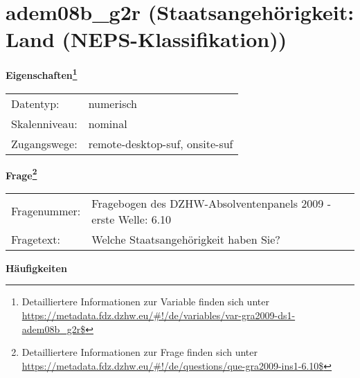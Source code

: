
    \setcounter{footnote}{0}

    \vspace*{-1.8cm}
	\section{adem08b\_g2r (Staatsangehörigkeit: Land (NEPS-Klassifikation))}
	\label{section:adem08b_g2r}



    \vspace*{0.5cm}
    \noindent\textbf{Eigenschaften\footnote{Detailliertere Informationen zur Variable finden sich unter
		\url{https://metadata.fdz.dzhw.eu/\#!/de/variables/var-gra2009-ds1-adem08b_g2r$}}}\\
	\begin{tabularx}{\hsize}{@{}lX}
	Datentyp: & numerisch \\
	Skalenniveau: & nominal \\
	Zugangswege: &
	  remote-desktop-suf, 
	  onsite-suf
 \\
    \end{tabularx}



				\vspace*{0.5cm}
                \noindent\textbf{Frage\footnote{Detailliertere Informationen zur Frage finden sich unter
		              \url{https://metadata.fdz.dzhw.eu/\#!/de/questions/que-gra2009-ins1-6.10$}}}\\
				\begin{tabularx}{\hsize}{@{}lX}
					Fragenummer: &
					  Fragebogen des DZHW-Absolventenpanels 2009 - erste Welle:
					  6.10
 \\
					Fragetext: & Welche Staatsangehörigkeit haben Sie? \\
				\end{tabularx}





        		\vspace*{0.5cm}
                \noindent\textbf{Häufigkeiten}

